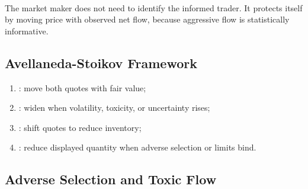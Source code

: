 \documentclass[a4paper,oneside,openany]{book}
\begin{document}

\begin{principle} \\
The market maker does not need to identify the informed trader. It protects itself by moving price with observed net flow, because aggressive flow is statistically informative.
\end{principle}

\subsection*{Avellaneda-Stoikov Framework}


\begin{taxonomy} 
\begin{enumerate}[label=\roman*.]
\setlength{\itemsep}{0pt}
\item {}: move both quotes with fair value;
\item {}: widen when volatility, toxicity, or uncertainty rises;
\item {}: shift quotes to reduce inventory;
\item {}: reduce displayed quantity when adverse selection or limits bind.
\end{enumerate}
\end{taxonomy}


\subsection*{Adverse Selection and Toxic Flow}
\end{document}

